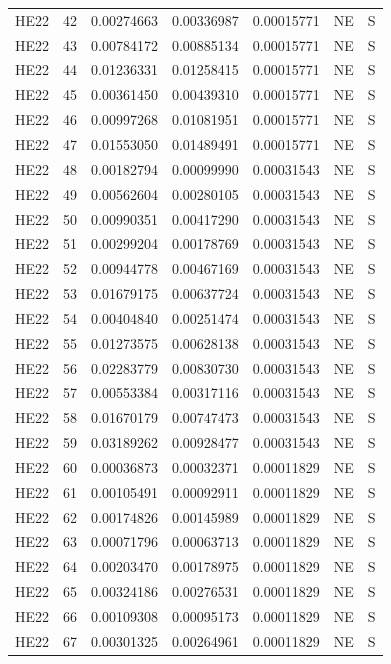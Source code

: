 \documentclass[11pt]{article}
\begin{document}
{\begin{longtable}{llrrrll}
HE22 & 42 & 0.00274663 & 0.00336987 & 0.00015771 & NE & S\\
HE22 & 43 & 0.00784172 & 0.00885134 & 0.00015771 & NE & S\\
HE22 & 44 & 0.01236331 & 0.01258415 & 0.00015771 & NE & S\\
HE22 & 45 & 0.00361450 & 0.00439310 & 0.00015771 & NE & S\\
HE22 & 46 & 0.00997268 & 0.01081951 & 0.00015771 & NE & S\\
HE22 & 47 & 0.01553050 & 0.01489491 & 0.00015771 & NE & S\\
HE22 & 48 & 0.00182794 & 0.00099990 & 0.00031543 & NE & S\\
HE22 & 49 & 0.00562604 & 0.00280105 & 0.00031543 & NE & S\\
HE22 & 50 & 0.00990351 & 0.00417290 & 0.00031543 & NE & S\\
HE22 & 51 & 0.00299204 & 0.00178769 & 0.00031543 & NE & S\\
HE22 & 52 & 0.00944778 & 0.00467169 & 0.00031543 & NE & S\\
HE22 & 53 & 0.01679175 & 0.00637724 & 0.00031543 & NE & S\\
HE22 & 54 & 0.00404840 & 0.00251474 & 0.00031543 & NE & S\\
HE22 & 55 & 0.01273575 & 0.00628138 & 0.00031543 & NE & S\\
HE22 & 56 & 0.02283779 & 0.00830730 & 0.00031543 & NE & S\\
HE22 & 57 & 0.00553384 & 0.00317116 & 0.00031543 & NE & S\\
HE22 & 58 & 0.01670179 & 0.00747473 & 0.00031543 & NE & S\\
HE22 & 59 & 0.03189262 & 0.00928477 & 0.00031543 & NE & S\\
HE22 & 60 & 0.00036873 & 0.00032371 & 0.00011829 & NE & S\\
HE22 & 61 & 0.00105491 & 0.00092911 & 0.00011829 & NE & S\\
HE22 & 62 & 0.00174826 & 0.00145989 & 0.00011829 & NE & S\\
HE22 & 63 & 0.00071796 & 0.00063713 & 0.00011829 & NE & S\\
HE22 & 64 & 0.00203470 & 0.00178975 & 0.00011829 & NE & S\\
HE22 & 65 & 0.00324186 & 0.00276531 & 0.00011829 & NE & S\\
HE22 & 66 & 0.00109308 & 0.00095173 & 0.00011829 & NE & S\\
HE22 & 67 & 0.00301325 & 0.00264961 & 0.00011829 & NE & S\\

\end{longtable}}
\end{document}
